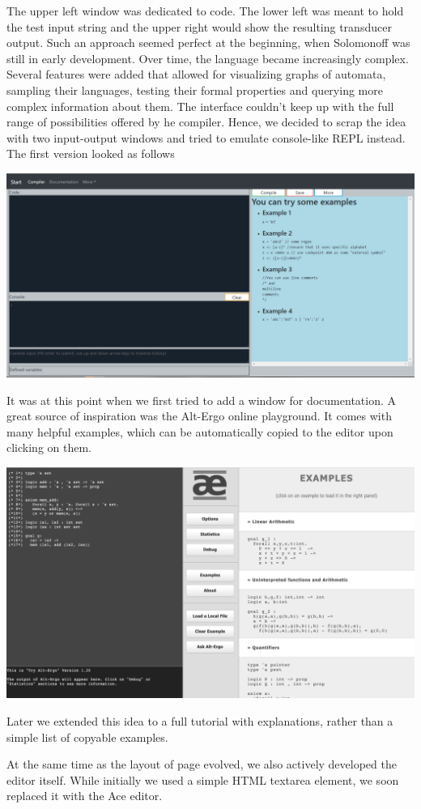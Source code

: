 The upper left window was dedicated to code. The lower left was meant to hold the test input string and the upper right would show the resulting transducer output. Such an approach seemed perfect at the beginning, when Solomonoff was still in early development. Over time, the language became increasingly complex. Several features were added that allowed for visualizing graphs of automata, sampling their languages, testing their formal properties and querying more complex information about them. The interface couldn't keep up with the full range of possibilities offered by he compiler. Hence, we decided to scrap the idea with two input-output windows and tried to emulate console-like REPL instead. The first version looked as follows
\begin{center}
	\includegraphics[scale=0.2]{web6.png}
\end{center}
It was at this point when we first tried to add a window for documentation. A great source of inspiration was the Alt-Ergo online playground. It comes with many helpful examples, which can be automatically copied to the editor upon clicking on them.
\begin{center}
	\includegraphics[scale=0.3]{alt-ergo.png}
\end{center}
Later we extended this idea to a full tutorial with explanations, rather than a simple list of copyable examples. 

At the same time as the layout of page evolved, we also actively developed the editor itself. While initially we used a simple HTML textarea element, we soon replaced it with the Ace editor. 






